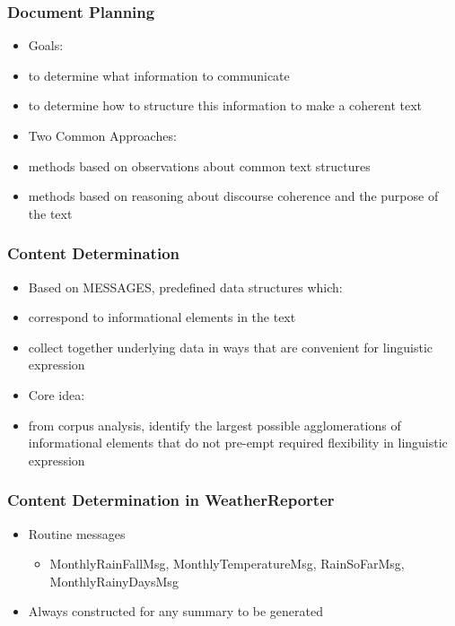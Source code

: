 \documentclass[compress,color=usenames]{beamer}
\begin{document}
\begin{frame}
\frametitle{Document Planning}

\label{f122}
\begin{itemize}
\item { {Goals: }}
\item { {to determine what information to communicate}}
\item { {to determine how to structure this information to make a coherent text}}
\item { {Two Common Approaches:}}
\item { {methods based on observations about common text structures}}
\item { {methods based on reasoning about discourse coherence and the purpose of the text }}
\end{itemize}

 
\end{frame}

\begin{frame}
\frametitle{Content Determination}

\label{f124}
\begin{itemize}
\item { {Based on MESSAGES, predefined data structures which:}}
\item { {correspond to informational elements in the text}}
\item { {collect together underlying data in ways that are convenient for linguistic expression}}
\item { {Core idea:}}
\item { {from corpus analysis, identify the largest possible agglomerations of informational elements that do not pre-empt required flexibility in linguistic expression}}
\end{itemize}

 
\end{frame}

\begin{frame}
\frametitle{Content Determination in WeatherReporter}

\label{f126}
\begin{itemize}
\item { {Routine messages}}
\begin{itemize}
\item MonthlyRainFallMsg, 
MonthlyTemperatureMsg, 
RainSoFarMsg, 
MonthlyRainyDaysMsg
\end{itemize}
\item { {Always constructed for any summary to be generated}}
\end{itemize}

 
\end{frame}
\end{document}
